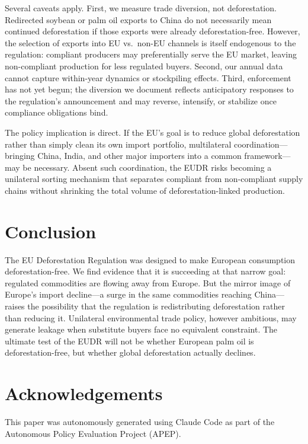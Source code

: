 \documentclass[12pt]{article}
\begin{document}
Several caveats apply. First, we measure trade diversion, not deforestation. Redirected soybean or palm oil exports to China do not necessarily mean continued deforestation if those exports were already deforestation-free. However, the selection of exports into EU vs.\ non-EU channels is itself endogenous to the regulation: compliant producers may preferentially serve the EU market, leaving non-compliant production for less regulated buyers. Second, our annual data cannot capture within-year dynamics or stockpiling effects. Third, enforcement has not yet begun; the diversion we document reflects anticipatory responses to the regulation's announcement and may reverse, intensify, or stabilize once compliance obligations bind.

The policy implication is direct. If the EU's goal is to reduce global deforestation rather than simply clean its own import portfolio, multilateral coordination---bringing China, India, and other major importers into a common framework---may be necessary. Absent such coordination, the EUDR risks becoming a unilateral sorting mechanism that separates compliant from non-compliant supply chains without shrinking the total volume of deforestation-linked production.


\section{Conclusion}

The EU Deforestation Regulation was designed to make European consumption deforestation-free. We find evidence that it is succeeding at that narrow goal: regulated commodities are flowing away from Europe. But the mirror image of Europe's import decline---a surge in the same commodities reaching China---raises the possibility that the regulation is redistributing deforestation rather than reducing it. Unilateral environmental trade policy, however ambitious, may generate leakage when substitute buyers face no equivalent constraint. The ultimate test of the EUDR will not be whether European palm oil is deforestation-free, but whether global deforestation actually declines.

\section*{Acknowledgements}

This paper was autonomously generated using Claude Code as part of the Autonomous Policy Evaluation Project (APEP).
\end{document}
